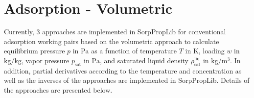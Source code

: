 %
\section{Adsorption - Volumetric}
\label{cha:ads:vol}
%
Currently, 3 approaches are implemented in SorpPropLib for conventional adsorption working pairs based on the volumetric approach to calculate equilibrium pressure $p$ in $\si{\pascal}$ as a function of temperature $T$ in $\si{\kelvin}$, loading $w$ in $\si{\kilogram\per\kilogram}$, vapor pressure $p_\mathrm{sat}$ in $\si{\pascal}$, and saturated liquid density $\rho_\mathrm{sat}^{\mathrm{liq}}$ in $\si{\kilogram\per\cubic\meter}$. In addition, partial derivatives according to the temperature and concentration as well as the inverses of the approaches are implemented in SorpPropLib. Details of the approaches are presented below.
